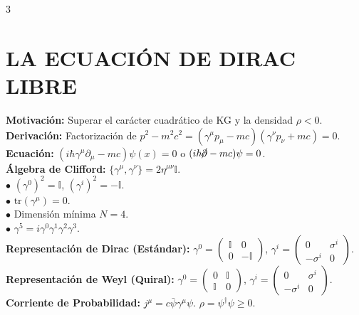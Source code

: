 \documentclass[8pt,a4paper,fleqn]{extarticle} %
\begin{document}
\begin{multicols}{3}
\section{LA ECUACIÓN DE DIRAC LIBRE}
\textbf{Motivación:} Superar el carácter cuadrático de KG y la densidad $\rho < 0$.
\\\textbf{Derivación:} Factorización de $p^2 - m^2c^2 = (\gamma^\mu p_\mu - mc)(\gamma^\nu p_\nu + mc) = 0$.\\
\textbf{Ecuación:} $(i\hbar \gamma^\mu \partial_\mu - mc)\psi(x) = 0$ o $(i\hbar \cancel{\partial} - mc)\psi = 0$.
\\\textbf{Álgebra de Clifford:} $\{\gamma^\mu, \gamma^\nu\} = 2\eta^{\mu\nu}\mathbb{I}$.\\
$\bullet$ $(\gamma^0)^2 = \mathbb{I}$, $(\gamma^i)^2 = -\mathbb{I}$.\\ $\bullet$ $\text{tr}(\gamma^\mu) = 0$.\\$\bullet$ Dimensión mínima $N=4$.\\
$\bullet$ $\gamma^5 = i\gamma^0 \gamma^1 \gamma^2 \gamma^3$.
\\\textbf{Representación de Dirac (Estándar):}
$\gamma^0 = \begin{pmatrix} \mathbb{I} & 0 \\ 0 & -\mathbb{I} \end{pmatrix}$, $\gamma^i = \begin{pmatrix} 0 & \sigma^i \\ -\sigma^i & 0 \end{pmatrix}$.
\textbf{Representación de Weyl (Quiral):}
$\gamma^0 = \begin{pmatrix} 0 & \mathbb{I} \\ \mathbb{I} & 0 \end{pmatrix}$, $\gamma^i = \begin{pmatrix} 0 & \sigma^i \\ -\sigma^i & 0 \end{pmatrix}$.\\
\textbf{Corriente de Probabilidad:} $j^\mu = c \bar{\psi}\gamma^\mu \psi$. $\rho = \psi^\dagger \psi \ge 0$.


\end{multicols}
\end{document}
